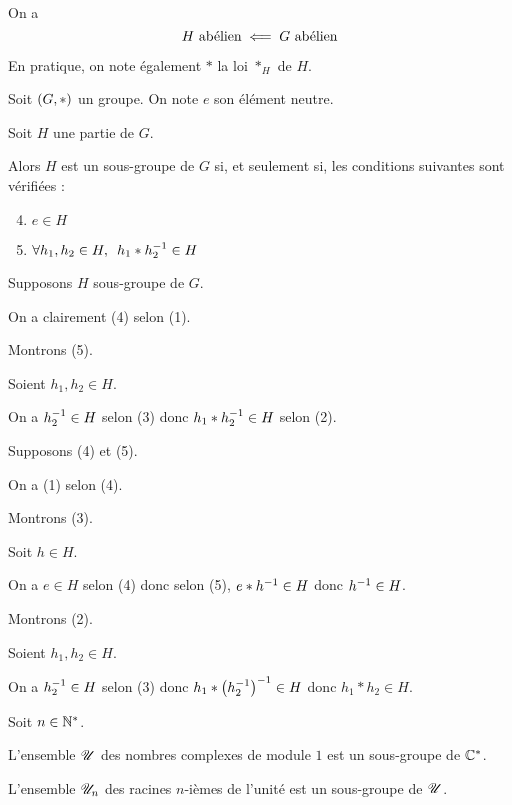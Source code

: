 \begin{rem}
On a \[H\text{ abélien}\impliedby G\text{ abélien}\]
\end{rem}

\begin{rem}
En pratique, on note également \(*\) la loi \(*_H\) de \(H\).
\end{rem}

\begin{prop}
Soit \(\groupe{G}[*]\) un groupe. On note \(e\) son élément neutre.

Soit \(H\) une partie de \(G\).

Alors \(H\) est un sous-groupe de \(G\) si, et seulement si, les conditions suivantes sont vérifiées :

\begin{enumerate}\setcounter{enumi}{3}
\item \(e\in H\) \\

\item \(\quantifs{\forall h_1,h_2\in H}h_1*h_2\inv\in H\) \\
\end{enumerate}
\end{prop}

\begin{dem}
\impdir

Supposons \(H\) sous-groupe de \(G\).

On a clairement (4) selon (1).

Montrons (5).

Soient \(h_1,h_2\in H\).

On a \(h_2^{-1}\in H\) selon (3) donc \(h_1*h_2^{-1}\in H\) selon (2).

\imprec

Supposons (4) et (5).

On a (1) selon (4).

Montrons (3).

Soit \(h\in H\).

On a \(e\in H\) selon (4) donc selon (5), \(e*h^{-1}\in H\) donc \(h^{-1}\in H\).

Montrons (2).

Soient \(h_1,h_2\in H\).

On a \(h_2^{-1}\in H\) selon (3) donc \(h_1*\left(h_2^{-1}\right)^{-1}\in H\) donc \(h_1*h_2\in H\).
\end{dem}

\begin{ex}
Soit \(n\in\mathbb{N}^*\).

L'ensemble \(\mathscr{U}\) des nombres complexes de module \(1\) est un sous-groupe de \(\mathbb{C}^*\).

L'ensemble \(\mathscr{U}_n\) des racines \(n\)-ièmes de l'unité est un sous-groupe de \(\mathscr{U}\).
\end{ex}

